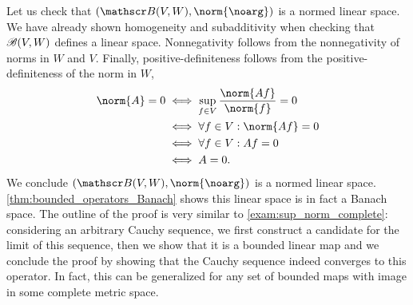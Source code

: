 Let us check that \((\bounded(V, W), \norm{\noarg})\) is a normed linear space. We have already shown homogeneity and subadditivity when checking that \(\mathscr{B}(V, W)\) defines a linear space. Nonnegativity follows from the nonnegativity of norms in \(W\) and \(V\). Finally, positive-definiteness follows from the positive-definiteness of the norm in \(W\),
\begin{align*}
    \norm{A} = 0 &\iff \sup_{f \in V} \frac{\norm{Af}}{\norm{f}} = 0\\
                 &\iff \forall f \in V : \norm{Af} = 0\\
                 &\iff \forall f \in V : Af = 0\\
                 &\iff A = 0.
\end{align*}
We conclude \((\bounded(V, W), \norm{\noarg})\) is a normed linear space. \cref{thm:bounded_operators_Banach} shows this linear space is in fact a Banach space. The outline of the proof is very similar to \cref{exam:sup_norm_complete}: considering an arbitrary Cauchy sequence, we first construct a candidate for the limit of this sequence, then we show that it is a bounded linear map and we conclude the proof by showing that the Cauchy sequence indeed converges to this operator. In fact, this can be generalized for any set of bounded maps with image in some complete metric space.


